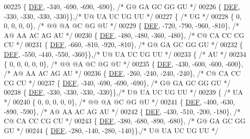 \begin{DoxyCode}
00225    \{ \mbox{\hyperlink{1_88_84__epars_8h_a397419fc12b37ed479c8abb9d444d843}{DEF}}, -340, -690, -690, -690\}, \textcolor{comment}{/* G@  GA  GC  GG  GU */}
00226    \{ \mbox{\hyperlink{1_88_84__epars_8h_a397419fc12b37ed479c8abb9d444d843}{DEF}}, -330, -330, -330, -330\}\},\textcolor{comment}{/* U@  UA  UC  UG  UU */}
00227   \{ \textcolor{comment}{/* UG */}
00228    \{   0,    0,    0,    0,    0\}, \textcolor{comment}{/* @@  @A  @C  @G  @U */}
00229    \{ \mbox{\hyperlink{1_88_84__epars_8h_a397419fc12b37ed479c8abb9d444d843}{DEF}}, -720, -790, -960, -810\}, \textcolor{comment}{/* A@  AA  AC  AG  AU */}
00230    \{ \mbox{\hyperlink{1_88_84__epars_8h_a397419fc12b37ed479c8abb9d444d843}{DEF}}, -480, -480, -360, -480\}, \textcolor{comment}{/* C@  CA  CC  CG  CU */}
00231    \{ \mbox{\hyperlink{1_88_84__epars_8h_a397419fc12b37ed479c8abb9d444d843}{DEF}}, -660, -810, -920, -810\}, \textcolor{comment}{/* G@  GA  GC  GG  GU */}
00232    \{ \mbox{\hyperlink{1_88_84__epars_8h_a397419fc12b37ed479c8abb9d444d843}{DEF}}, -550, -440, -550, -360\}\},\textcolor{comment}{/* U@  UA  UC  UG  UU */}
00233   \{ \textcolor{comment}{/* AU */}
00234    \{   0,    0,    0,    0,    0\}, \textcolor{comment}{/* @@  @A  @C  @G  @U */}
00235    \{ \mbox{\hyperlink{1_88_84__epars_8h_a397419fc12b37ed479c8abb9d444d843}{DEF}}, -430, -600, -600, -600\}, \textcolor{comment}{/* A@  AA  AC  AG  AU */}
00236    \{ \mbox{\hyperlink{1_88_84__epars_8h_a397419fc12b37ed479c8abb9d444d843}{DEF}}, -260, -240, -240, -240\}, \textcolor{comment}{/* C@  CA  CC  CG  CU */}
00237    \{ \mbox{\hyperlink{1_88_84__epars_8h_a397419fc12b37ed479c8abb9d444d843}{DEF}}, -340, -690, -690, -690\}, \textcolor{comment}{/* G@  GA  GC  GG  GU */}
00238    \{ \mbox{\hyperlink{1_88_84__epars_8h_a397419fc12b37ed479c8abb9d444d843}{DEF}}, -330, -330, -330, -330\}\},\textcolor{comment}{/* U@  UA  UC  UG  UU */}
00239   \{ \textcolor{comment}{/* UA */}
00240    \{   0,    0,    0,    0,    0\}, \textcolor{comment}{/* @@  @A  @C  @G  @U */}
00241    \{ \mbox{\hyperlink{1_88_84__epars_8h_a397419fc12b37ed479c8abb9d444d843}{DEF}}, -400, -630, -890, -590\}, \textcolor{comment}{/* A@  AA  AC  AG  AU */}
00242    \{ \mbox{\hyperlink{1_88_84__epars_8h_a397419fc12b37ed479c8abb9d444d843}{DEF}}, -430, -510, -200, -180\}, \textcolor{comment}{/* C@  CA  CC  CG  CU */}
00243    \{ \mbox{\hyperlink{1_88_84__epars_8h_a397419fc12b37ed479c8abb9d444d843}{DEF}}, -380, -680, -890, -680\}, \textcolor{comment}{/* G@  GA  GC  GG  GU */}
00244    \{ \mbox{\hyperlink{1_88_84__epars_8h_a397419fc12b37ed479c8abb9d444d843}{DEF}}, -280, -140, -280, -140\}\},\textcolor{comment}{/* U@  UA  UC  UG  UU */}

\end{DoxyCode}
